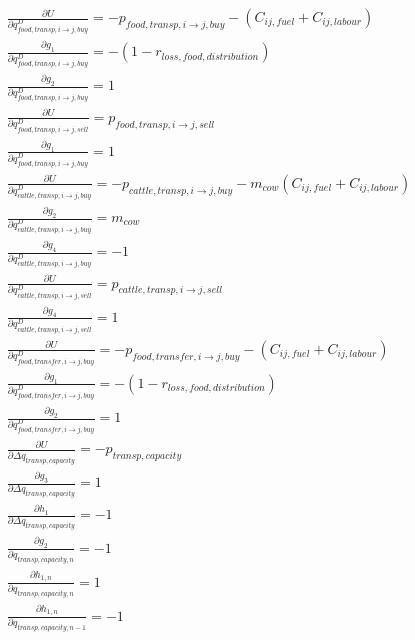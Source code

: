 \documentclass[letter,12pt]{article}
\begin{document}
\begin{gather}
\frac{\partial U}{\partial q_{food,transp,i \rightarrow j,buy}^D} = - p_{food,transp,i \rightarrow j,buy} - \left( C_{ij,fuel} + C_{ij,labour}\right) \\
\frac{\partial g_1}{\partial q_{food,transp,i \rightarrow j,buy}^D} = - \left( 1 - r_{loss,food,distribution}\right) \\
\frac{\partial g_2}{\partial q_{food,transp,i \rightarrow j,buy}^D} = 1 \\
\frac{\partial U}{\partial q_{food,transp,i \rightarrow j,sell}^D} = p_{food,transp,i \rightarrow j,sell} \\
\frac{\partial g_1}{\partial q_{food,transp,i \rightarrow j,buy}^D} = 1 \\
\frac{\partial U}{\partial q_{cattle,transp,i \rightarrow j,buy}^D} = - p_{cattle,transp,i \rightarrow j,buy} - m_{cow} \left( C_{ij,fuel} + C_{ij,labour}\right) \\
\frac{\partial g_2}{\partial q_{cattle,transp,i \rightarrow j,buy}^D} = m_{cow} \\
\frac{\partial g_4}{\partial q_{cattle,transp,i \rightarrow j,buy}^D} = -1 \\
\frac{\partial U}{\partial q_{cattle,transp,i \rightarrow j,sell}^D} = p_{cattle,transp,i \rightarrow j,sell} \\
\frac{\partial g_4}{\partial q_{cattle,transp,i \rightarrow j,sell}^D} = 1 \\
\frac{\partial U}{\partial q_{food,transfer,i \rightarrow j,buy}^D} = - p_{food,transfer,i \rightarrow j,buy} - \left( C_{ij,fuel} + C_{ij,labour}\right) \\
\frac{\partial g_1}{\partial q_{food,transfer,i \rightarrow j,buy}^D} = - \left( 1 - r_{loss,food,distribution}\right) \\
\frac{\partial g_2}{\partial q_{food,transfer,i \rightarrow j,buy}^D} = 1 \\
\frac{\partial U}{\partial \Delta q_{transp,capacity}} = - p_{transp,capacity} \\
\frac{\partial g_3}{\partial \Delta q_{transp,capacity}} = 1 \\
\frac{\partial h_1}{\partial \Delta q_{transp,capacity}} = -1 \\
\frac{\partial g_2}{\partial q_{transp,capacity,n}} = -1 \\
\frac{\partial h_{1,n}}{\partial q_{transp,capacity,n}} = 1 \\
\frac{\partial h_{1,n}}{\partial q_{transp,capacity,n-1}} = -1 \\
\end{gather}
\end{document}

